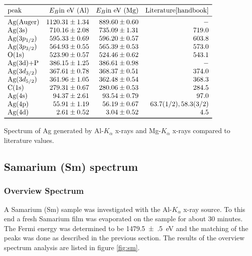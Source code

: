 \documentclass[a4paper]{scrartcl}
\numberwithin{equation}{section}
\numberwithin{figure}{section}
\numberwithin{table}{section}
\begin{document}
\begin{table}
\centering
$
\begin{array}{lrrr}
\toprule
\text{peak} & E_B \text{in eV (Al)}  &  E_B \text{in eV (Mg)} & \text{Literature} \cite{handbook} \\
\midrule
\text{Ag(Auger)} &  1120.31 \pm 1.34 &  889.60 \pm 0.60 &-\\
\text{Ag(3s)} &  710.16 \pm 2.08 &  735.09 \pm 1.31 &719.0\\
\text{Ag}(3p_{1/2}) & 595.33 \pm 0.69 &   596.20 \pm 0.57 &603.8 \\
\text{Ag}(3p_{3/2}) & 564.93 \pm 0.55 &   565.39 \pm 0.53  & 573.0\\
\text{O(1s)} & 523.90 \pm 0.57 &  524.46 \pm 0.62 &  543.1 \\
 \text{Ag(3d)+P} & 386.15 \pm 1.25 & 386.61 \pm 0.98  &-\\
\text{Ag}(3d_{3/2}) & 367.61 \pm 0.78 &  368.37 \pm 0.51 & 374.0 \\
\text{Ag} (3d_{5/2}) &  361.96 \pm 1.05 & 362.48 \pm 0.54 & 368.3 \\
 \text{C(1s)} & 279.31 \pm 0.67 &  280.06 \pm 0.53 & 284.5 \\
\text{Ag(4s)} & 94.37 \pm 2.61 &  93.54 \pm 0.79 & 97.0 \\
\text{Ag(4p)} & 55.91 \pm 1.19 & 56.19 \pm 0.67  & 63.7 (1/2), 58.3 (3/2) \\
 \text{Ag(4d)} & 2.61 \pm 0.52 &  3.04 \pm 0.52 & 4.5 \\
 \bottomrule
\end{array}
$
\caption{
\small Spectrum of Ag generated by Al-$K_\alpha$ x-rays and Mg-$K_\alpha$ x-rays compared to literature values.   } 
	\label{fig:tabelle}
\end{table}



\subsection{Samarium (Sm) spectrum}
\subsubsection{Overview Spectrum}
A Samarium (Sm) sample was investigated with the Al-$K_\alpha$ x-ray source. To this end a fresh Samarium film was evaporated on the sample for about 30 minutes. The Fermi energy was determined to be \SI{1479.5(5)}{eV} and the matching of the peaks was done as described in the previous section. The results of the overview spectrum analysis are listed in figure \ref{fig:sm}.
\end{document}
